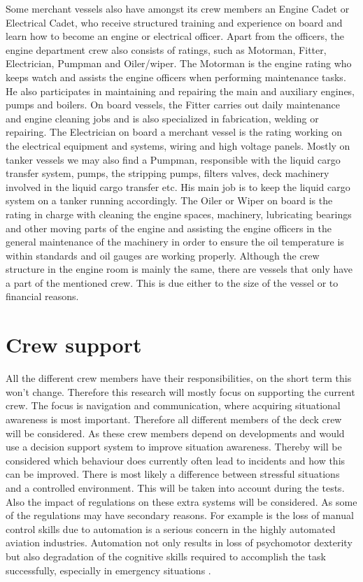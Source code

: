 Some merchant vessels also have amongst its crew members an Engine Cadet or Electrical Cadet, who receive structured training and experience on board and learn how to become an engine or electrical officer.
Apart from the officers, the engine department crew also consists of ratings, such as Motorman, Fitter, Electrician, Pumpman and Oiler/wiper.
The Motorman is the engine rating who keeps watch and assists the engine officers when performing maintenance tasks. He also participates in maintaining and repairing the main and auxiliary engines, pumps and boilers.
On board vessels, the Fitter carries out daily maintenance and engine cleaning jobs and is also specialized in fabrication, welding or repairing.
The Electrician on board a merchant vessel is the rating working on the electrical equipment and systems, wiring and high voltage panels.
Mostly on tanker vessels we may also find a Pumpman, responsible with the liquid cargo transfer system, pumps, the stripping pumps, filters valves, deck machinery involved in the liquid cargo transfer etc. His main job is to keep the liquid cargo system on a tanker running accordingly.
The Oiler or Wiper on board is the rating in charge with cleaning the engine spaces, machinery, lubricating bearings and other moving parts of the engine and assisting the engine officers in the general maintenance of the machinery in order to ensure the oil temperature is within standards and oil gauges are working properly.
Although the crew structure in the engine room is mainly the same, there are vessels that only have a part of the mentioned crew. This is due either to the size of the vessel or to financial reasons. \cite{Nedcon2013}

\section{Crew support}
All the different crew members have their responsibilities, on the short term this won't change. Therefore this research will mostly focus on supporting the current crew. The focus is navigation and communication, where acquiring situational awareness is most important. Therefore all different members of the deck crew will be considered. As these crew members depend on developments and would use a decision support system to improve situation awareness.
Thereby will be considered which behaviour does currently often lead to incidents and how this can be improved. There is most likely a difference between stressful situations and a controlled environment. This will be taken into account during the tests. Also the impact of regulations on these extra systems will be considered. As some of the regulations may have secondary reasons. For example is the loss of manual control skills due to automation is a serious concern in the highly automated aviation industries. Automation not only results in loss of psychomotor dexterity but also degradation of the cognitive skills required to accomplish the task successfully, especially in emergency situations \cite{Saffarian2012}.


